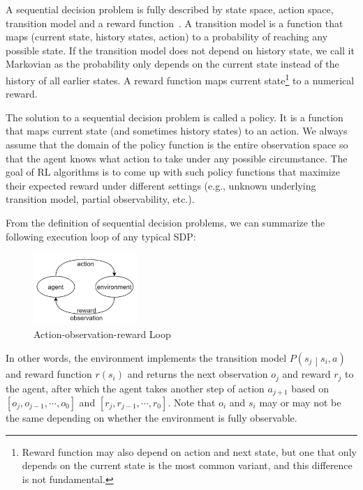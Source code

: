A sequential decision problem is fully described by state space, action space, transition model and a reward function~\parencite{russell}. A transition model is a function that maps (current state, history states, action) to a probability of reaching any possible state. If the transition model does not depend on history state, we call it Markovian as the probability only depends on the current state instead of the history of all earlier states. A reward function maps current state\footnote{Reward function may also depend on action and next state, but one that only depends on the current state is the most common variant, and this difference is not fundamental.} to a numerical reward.

The solution to a sequential decision problem is called a policy. It is a function that maps current state (and sometimes history states) to an action. We always assume that the domain of the policy function is the entire observation space so that the agent knows what action to take under any possible circumstance. The goal of RL algorithms is to come up with such policy functions that maximize their expected reward under different settings (e.g., unknown underlying transition model, partial observability, etc.).

From the definition of sequential decision problems, we can summarize the following execution loop of any typical SDP:

\begin{figure}[H]
    \centering
    \includegraphics[width=0.35\textwidth]{images/obr-loop.png}
    \caption{Action-observation-reward Loop}
    \label{fig:obr-loop}
\end{figure}

In other words, the environment implements the transition model $P\left(s_j\middle| s_i,a\right)$ and reward function $r\left(s_i\right)$ and returns the next observation $o_j$ and reward $r_j$ to the agent, after which the agent takes another step of action $a_{j+1}$ based on $\left[o_j,o_{j-1},\cdots,o_0\right]$ and $\left[r_j,r_{j-1},\cdots,r_0\right]$. Note that $o_i$ and $s_i$ may or may not be the same depending on whether the environment is fully observable.

